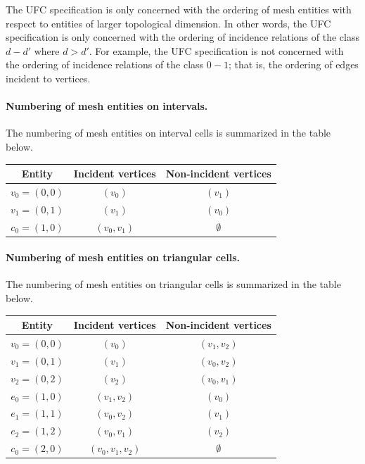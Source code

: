 The UFC specification is only concerned with the ordering of mesh
entities with respect to entities of larger topological dimension. In
other words, the UFC specification is only concerned with the ordering
of incidence relations of the class $d - d'$ where $d > d'$. For
example, the UFC specification is not concerned with the ordering of
incidence relations of the class $0 - 1$; that is, the ordering of
edges incident to vertices.

\paragraph{Numbering of mesh entities on intervals.}

The numbering of mesh entities on interval cells is summarized in the
table below.

\begin{center}
  \begin{tabular}{ccc}
    \toprule
    Entity & Incident vertices & Non-incident vertices \\
    \hline
    $v_0 = (0, 0)$ & $(v_0)$ & $(v_1)$ \\
    $v_1 = (0, 1)$ & $(v_1)$ & $(v_0)$ \\
    $c_0 = (1, 0)$ & $(v_0, v_1)$ & $\emptyset$ \\
    \bottomrule
  \end{tabular}
\end{center}

\paragraph{Numbering of mesh entities on triangular cells.}

The numbering of mesh entities on triangular cells is summarized in the
table below.

\begin{center}
  \begin{tabular}{ccc}
    \toprule
    Entity & Incident vertices & Non-incident vertices \\
    \hline
    $v_0 = (0, 0)$ & $(v_0)$ & $(v_1, v_2)$ \\
    $v_1 = (0, 1)$ & $(v_1)$ & $(v_0, v_2)$ \\
    $v_2 = (0, 2)$ & $(v_2)$ & $(v_0, v_1)$ \\
    $e_0 = (1, 0)$ & $(v_1, v_2)$ & $(v_0)$ \\
    $e_1 = (1, 1)$ & $(v_0, v_2)$ & $(v_1)$ \\
    $e_2 = (1, 2)$ & $(v_0, v_1)$ & $(v_2)$ \\
    $c_0 = (2, 0)$ & $(v_0, v_1, v_2)$ & $\emptyset$ \\
    \bottomrule
  \end{tabular}
\end{center}

